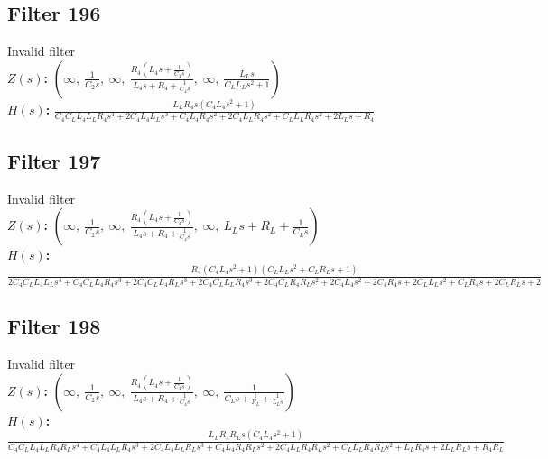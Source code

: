 \documentclass{article}
\begin{document}
\subsection*{Filter 196}
Invalid filter \\ 
\textbf{$Z(s)$:} $\left( \infty, \  \frac{1}{C_{2} s}, \  \infty, \  \frac{R_{4} \left(L_{4} s + \frac{1}{C_{4} s}\right)}{L_{4} s + R_{4} + \frac{1}{C_{4} s}}, \  \infty, \  \frac{L_{L} s}{C_{L} L_{L} s^{2} + 1}\right)$ \\ 
\textbf{$H(s)$:} $\frac{L_{L} R_{4} s \left(C_{4} L_{4} s^{2} + 1\right)}{C_{4} C_{L} L_{4} L_{L} R_{4} s^{4} + 2 C_{4} L_{4} L_{L} s^{3} + C_{4} L_{4} R_{4} s^{2} + 2 C_{4} L_{L} R_{4} s^{2} + C_{L} L_{L} R_{4} s^{2} + 2 L_{L} s + R_{4}}$ \\ 
\subsection*{Filter 197}
Invalid filter \\ 
\textbf{$Z(s)$:} $\left( \infty, \  \frac{1}{C_{2} s}, \  \infty, \  \frac{R_{4} \left(L_{4} s + \frac{1}{C_{4} s}\right)}{L_{4} s + R_{4} + \frac{1}{C_{4} s}}, \  \infty, \  L_{L} s + R_{L} + \frac{1}{C_{L} s}\right)$ \\ 
\textbf{$H(s)$:} $\frac{R_{4} \left(C_{4} L_{4} s^{2} + 1\right) \left(C_{L} L_{L} s^{2} + C_{L} R_{L} s + 1\right)}{2 C_{4} C_{L} L_{4} L_{L} s^{4} + C_{4} C_{L} L_{4} R_{4} s^{3} + 2 C_{4} C_{L} L_{4} R_{L} s^{3} + 2 C_{4} C_{L} L_{L} R_{4} s^{3} + 2 C_{4} C_{L} R_{4} R_{L} s^{2} + 2 C_{4} L_{4} s^{2} + 2 C_{4} R_{4} s + 2 C_{L} L_{L} s^{2} + C_{L} R_{4} s + 2 C_{L} R_{L} s + 2}$ \\ 
\subsection*{Filter 198}
Invalid filter \\ 
\textbf{$Z(s)$:} $\left( \infty, \  \frac{1}{C_{2} s}, \  \infty, \  \frac{R_{4} \left(L_{4} s + \frac{1}{C_{4} s}\right)}{L_{4} s + R_{4} + \frac{1}{C_{4} s}}, \  \infty, \  \frac{1}{C_{L} s + \frac{1}{R_{L}} + \frac{1}{L_{L} s}}\right)$ \\ 
\textbf{$H(s)$:} $\frac{L_{L} R_{4} R_{L} s \left(C_{4} L_{4} s^{2} + 1\right)}{C_{4} C_{L} L_{4} L_{L} R_{4} R_{L} s^{4} + C_{4} L_{4} L_{L} R_{4} s^{3} + 2 C_{4} L_{4} L_{L} R_{L} s^{3} + C_{4} L_{4} R_{4} R_{L} s^{2} + 2 C_{4} L_{L} R_{4} R_{L} s^{2} + C_{L} L_{L} R_{4} R_{L} s^{2} + L_{L} R_{4} s + 2 L_{L} R_{L} s + R_{4} R_{L}}$ \\ 
\end{document}
